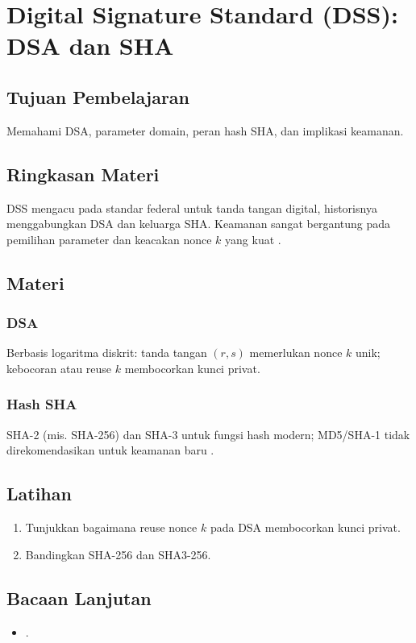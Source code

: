 \documentclass[../main.tex]{subfiles}
\begin{document}
\chapter{Digital Signature Standard (DSS): DSA dan SHA}
\section{Tujuan Pembelajaran}
Memahami DSA, parameter domain, peran hash SHA, dan implikasi keamanan.

\section{Ringkasan Materi}
DSS mengacu pada standar federal untuk tanda tangan digital, historisnya menggabungkan DSA dan keluarga SHA. Keamanan sangat bergantung pada pemilihan parameter dan keacakan nonce \(k\) yang kuat \citep{fips186_5,fips1804}.

\section{Materi}
\subsection{DSA}
Berbasis logaritma diskrit: tanda tangan \((r,s)\) memerlukan nonce \(k\) unik; kebocoran atau reuse \(k\) membocorkan kunci privat.

\subsection{Hash SHA}
SHA-2 (mis. SHA-256) dan SHA-3 untuk fungsi hash modern; MD5/SHA-1 tidak direkomendasikan untuk keamanan baru \citep{fips1804,fips202}.

\section{Latihan}
\begin{enumerate}
  \item Tunjukkan bagaimana reuse nonce \(k\) pada DSA membocorkan kunci privat.
  \item Bandingkan SHA-256 dan SHA3-256.
\end{enumerate}

\section{Bacaan Lanjutan}
\begin{itemize}
  \item \citep{fips186_5,fips1804,fips202}.
\end{itemize}
\end{document}
